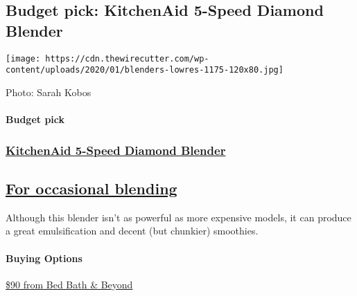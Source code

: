 \hypertarget{budget-pick-kitchenaid-5-speed-diamond-blender}{%
\subsection{Budget pick: KitchenAid 5-Speed Diamond
Blender}\label{budget-pick-kitchenaid-5-speed-diamond-blender}}

\texttt{[image: https://cdn.thewirecutter.com/wp-content/uploads/2020/01/blenders-lowres-1175-120x80.jpg]}

Photo: Sarah Kobos

\hypertarget{budget-pick-2}{%
\paragraph{Budget pick}\label{budget-pick-2}}

\href{https://www.nytimes3xbfgragh.onion/wirecutter/out/link/35968/159119/4/109197?merchant=Bed\%20Bath\%20\%26\%20Beyond}{}

\hypertarget{kitchenaid-5-speed-diamond-blender-2}{%
\subsubsection{\texorpdfstring{\href{https://www.nytimes3xbfgragh.onion/wirecutter/out/link/35968/159119/4/109197?merchant=Bed\%20Bath\%20\%26\%20Beyond}{KitchenAid
5-Speed Diamond
Blender}}{KitchenAid 5-Speed Diamond Blender}}\label{kitchenaid-5-speed-diamond-blender-2}}

\hypertarget{for-occasional-blending-2}{%
\subsection{\texorpdfstring{\href{https://www.nytimes3xbfgragh.onion/wirecutter/out/link/35968/159119/4/109197?merchant=Bed\%20Bath\%20\%26\%20Beyond}{For
occasional
blending}}{For occasional blending}}\label{for-occasional-blending-2}}

Although this blender isn't as powerful as more expensive models, it can
produce a great emulsification and decent (but chunkier) smoothies.

\hypertarget{buying-options-11}{%
\paragraph{Buying Options}\label{buying-options-11}}

\href{https://shop-links.co/1696305516080111511}{\$90 from Bed Bath \&
Beyond}


